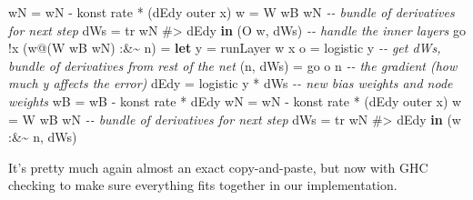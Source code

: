 \documentclass[]{article}
\newenvironment{Shaded}{}{}
\newcommand{\CommentTok}[1]{\textcolor[rgb]{0.38,0.63,0.69}{\textit{#1}}}
\newcommand{\DataTypeTok}[1]{\textcolor[rgb]{0.56,0.13,0.00}{#1}}
\newcommand{\KeywordTok}[1]{\textcolor[rgb]{0.00,0.44,0.13}{\textbf{#1}}}
\newcommand{\NormalTok}[1]{#1}
\newcommand{\OperatorTok}[1]{\textcolor[rgb]{0.40,0.40,0.40}{#1}}
\newcommand{\OtherTok}[1]{\textcolor[rgb]{0.00,0.44,0.13}{#1}}
\begin{document}
\begin{Shaded}
\begin{Highlighting}[]
\NormalTok{              wN\textquotesingle{}  }\OtherTok{=}\NormalTok{ wN }\OperatorTok{{-}}\NormalTok{ konst rate }\OperatorTok{*}\NormalTok{ (dEdy }\OtherTok{\textasciigrave{}outer\textasciigrave{}}\NormalTok{ x)}
\NormalTok{              w\textquotesingle{}   }\OtherTok{=} \DataTypeTok{W}\NormalTok{ wB\textquotesingle{} wN\textquotesingle{}}
              \CommentTok{{-}{-} bundle of derivatives for next step}
\NormalTok{              dWs  }\OtherTok{=}\NormalTok{ tr wN }\OperatorTok{\#\textgreater{}}\NormalTok{ dEdy}
          \KeywordTok{in}\NormalTok{  (}\DataTypeTok{O}\NormalTok{ w\textquotesingle{}, dWs)}
    \CommentTok{{-}{-} handle the inner layers}
\NormalTok{    go }\OperatorTok{!}\NormalTok{x (w}\OperatorTok{@}\NormalTok{(}\DataTypeTok{W}\NormalTok{ wB wN) }\OperatorTok{:\&\textasciitilde{}}\NormalTok{ n)}
        \OtherTok{=} \KeywordTok{let}\NormalTok{ y          }\OtherTok{=}\NormalTok{ runLayer w x}
\NormalTok{              o          }\OtherTok{=}\NormalTok{ logistic y}
              \CommentTok{{-}{-} get dWs\textquotesingle{}, bundle of derivatives from rest of the net}
\NormalTok{              (n\textquotesingle{}, dWs\textquotesingle{}) }\OtherTok{=}\NormalTok{ go o n}
              \CommentTok{{-}{-} the gradient (how much y affects the error)}
\NormalTok{              dEdy       }\OtherTok{=}\NormalTok{ logistic\textquotesingle{} y }\OperatorTok{*}\NormalTok{ dWs\textquotesingle{}}
              \CommentTok{{-}{-} new bias weights and node weights}
\NormalTok{              wB\textquotesingle{}  }\OtherTok{=}\NormalTok{ wB }\OperatorTok{{-}}\NormalTok{ konst rate }\OperatorTok{*}\NormalTok{ dEdy}
\NormalTok{              wN\textquotesingle{}  }\OtherTok{=}\NormalTok{ wN }\OperatorTok{{-}}\NormalTok{ konst rate }\OperatorTok{*}\NormalTok{ (dEdy }\OtherTok{\textasciigrave{}outer\textasciigrave{}}\NormalTok{ x)}
\NormalTok{              w\textquotesingle{}   }\OtherTok{=} \DataTypeTok{W}\NormalTok{ wB\textquotesingle{} wN\textquotesingle{}}
              \CommentTok{{-}{-} bundle of derivatives for next step}
\NormalTok{              dWs  }\OtherTok{=}\NormalTok{ tr wN }\OperatorTok{\#\textgreater{}}\NormalTok{ dEdy}
          \KeywordTok{in}\NormalTok{  (w\textquotesingle{} }\OperatorTok{:\&\textasciitilde{}}\NormalTok{ n\textquotesingle{}, dWs)}
\end{Highlighting}
\end{Shaded}

It's pretty much again almost an exact copy-and-paste, but now with GHC checking
to make sure everything fits together in our implementation.
\end{document}
